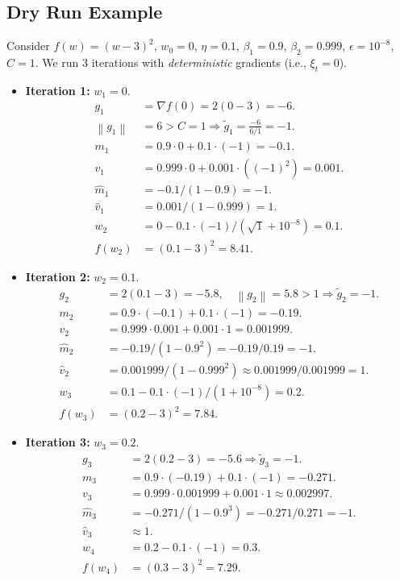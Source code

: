 \documentclass{article}
\newcommand{\norm}[1]{\left\| #1 \right\|}
\begin{document}
\subsection*{Dry Run Example}
Consider $f(w) = (w-3)^2$, $w_0 = 0$, $\eta = 0.1$, $\beta_1 = 0.9$, $\beta_2 = 0.999$, $\epsilon = 10^{-8}$, $C = 1$. We run 3 iterations with \textit{deterministic} gradients (i.e., $\xi_t = 0$).
\begin{itemize}
    \item \textbf{Iteration 1:} $w_1 = 0$.
        \begin{align*}
            g_1 &= \nabla f(0) = 2(0-3) = -6. \\
            \norm{g_1} &= 6 > C=1 \Rightarrow \tilde{g}_1 = \frac{-6}{6/1} = -1. \\
            m_1 &= 0.9 \cdot 0 + 0.1 \cdot (-1) = -0.1. \\
            v_1 &= 0.999 \cdot 0 + 0.001 \cdot ((-1)^2) = 0.001. \\
            \hat{m}_1 &= -0.1 / (1-0.9) = -1. \\
            \hat{v}_1 &= 0.001 / (1-0.999) = 1. \\
            w_2 &= 0 - 0.1 \cdot (-1) / (\sqrt{1} + 10^{-8}) = 0.1. \\
            f(w_2) &= (0.1-3)^2 = 8.41.
        \end{align*}
    \item \textbf{Iteration 2:} $w_2 = 0.1$.
        \begin{align*}
            g_2 &= 2(0.1-3) = -5.8, \quad \norm{g_2}=5.8 > 1 \Rightarrow \tilde{g}_2 = -1. \\
            m_2 &= 0.9 \cdot (-0.1) + 0.1 \cdot (-1) = -0.19. \\
            v_2 &= 0.999 \cdot 0.001 + 0.001 \cdot 1 = 0.001999. \\
            \hat{m}_2 &= -0.19 / (1-0.9^2) = -0.19 / 0.19 = -1. \\
            \hat{v}_2 &= 0.001999 / (1-0.999^2) \approx 0.001999 / 0.001999 = 1. \\
            w_3 &= 0.1 - 0.1 \cdot (-1) / (1 + 10^{-8}) = 0.2. \\
            f(w_3) &= (0.2-3)^2 = 7.84.
        \end{align*}
    \item \textbf{Iteration 3:} $w_3 = 0.2$.
        \begin{align*}
            g_3 &= 2(0.2-3) = -5.6 \Rightarrow \tilde{g}_3 = -1. \\
            m_3 &= 0.9 \cdot (-0.19) + 0.1 \cdot (-1) = -0.271. \\
            v_3 &= 0.999 \cdot 0.001999 + 0.001 \cdot 1 \approx 0.002997. \\
            \hat{m}_3 &= -0.271 / (1-0.9^3) = -0.271 / 0.271 = -1. \\
            \hat{v}_3 &\approx 1. \\
            w_4 &= 0.2 - 0.1 \cdot (-1) = 0.3. \\
            f(w_4) &= (0.3-3)^2 = 7.29.
        \end{align*}
\end{itemize}
\end{document}
